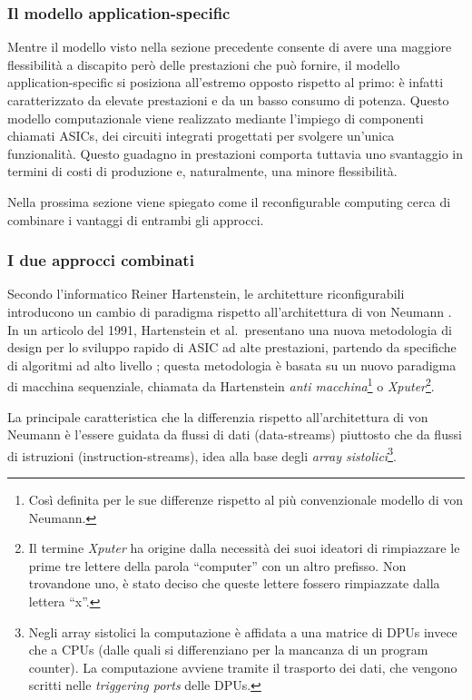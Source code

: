 \subsubsection{Il modello application-specific}
Mentre il modello visto nella sezione precedente consente di avere una maggiore
flessibilità a discapito però delle prestazioni che può fornire, il modello
application-specific si posiziona all'estremo opposto rispetto al primo: è infatti
caratterizzato da elevate prestazioni e da un basso consumo di potenza. Questo modello
computazionale viene realizzato mediante l'impiego di componenti chiamati \acp{ASIC},
dei circuiti integrati progettati per svolgere un'unica funzionalità. Questo guadagno
in prestazioni comporta tuttavia uno svantaggio in termini di costi di produzione e,
naturalmente, una minore flessibilità.

Nella prossima sezione viene spiegato come il reconfigurable computing cerca di combinare
i vantaggi di entrambi gli approcci.


\subsubsection{I due approcci combinati}
Secondo l'informatico Reiner Hartenstein, le architetture riconfigurabili introducono un
cambio di paradigma rispetto all'architettura di von Neumann
\cite{HartensteinParadigmShift}. In un articolo del 1991, Hartenstein et al.~presentano
una nuova metodologia di design per lo sviluppo rapido di \ac{ASIC} ad alte prestazioni,
partendo da specifiche di algoritmi ad alto livello \cite{HartensteinNovelASICDesign};
questa metodologia è basata su un nuovo paradigma di macchina sequenziale, chiamata da
Hartenstein \emph{anti macchina}\footnote{Così definita per le sue differenze rispetto al
più convenzionale modello di von Neumann.} o \emph{Xputer}\footnote{Il termine
\emph{Xputer} ha origine dalla necessità dei suoi ideatori di rimpiazzare le prime tre
lettere della parola ``computer'' con un altro prefisso. Non trovandone uno, è stato
deciso che queste lettere fossero rimpiazzate dalla lettera ``x''.}.

La principale caratteristica che la differenzia rispetto all'architettura di von Neumann è
l'essere guidata da flussi di dati (data-streams) piuttosto che da flussi di istruzioni
(instruction-streams), idea alla base degli \emph{array sistolici}\footnote{Negli array
sistolici la computazione è affidata a una matrice di \acp{DPU} invece che a \acsp{CPU}
(dalle quali si differenziano per la mancanza di un program counter). La computazione
avviene tramite il trasporto dei dati, che vengono scritti nelle \emph{triggering ports}
delle \acp{DPU}.}.

